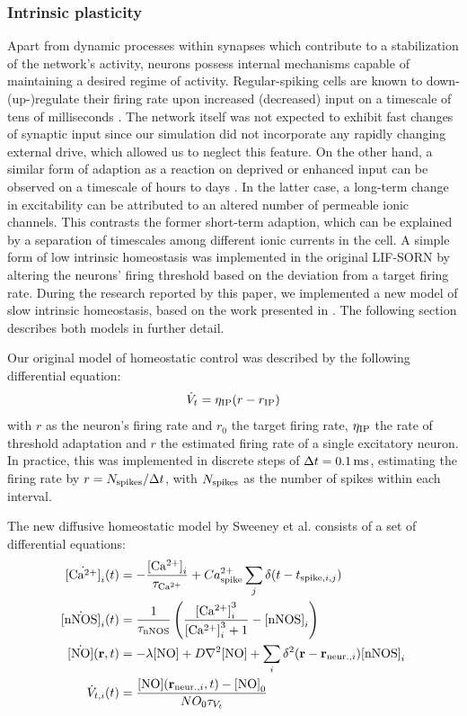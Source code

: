 \documentclass[10pt,letterpaper]{article}
\begin{document}
\subsubsection*{Intrinsic plasticity}
Apart from dynamic processes within synapses which contribute to a stabilization of the network's activity, neurons possess internal mechanisms capable of maintaining a desired regime of activity. Regular-spiking cells are known to down-(up-)regulate their firing rate upon increased (decreased) input on a timescale of tens of milliseconds \cite{Connors_Gutnick_Spike_Patterns,Benda_Herz_Spike_Frequ_Adaption}. The network itself was not expected to exhibit fast changes of synaptic input since our simulation did not incorporate any rapidly changing external drive, which allowed us to neglect this feature. On the other hand, a similar form of adaption as a reaction on deprived or enhanced input can be observed on a timescale of hours to days \cite{Desai_IP}. In the latter case, a long-term change in excitability can be attributed to an altered number of permeable ionic channels. This contrasts the former short-term adaption, which can be explained by a separation of timescales among different ionic currents in the cell. A simple form of low intrinsic homeostasis was implemented in the original LIF-SORN by altering the neurons' firing threshold based on the deviation from a target firing rate. During the research reported by this paper, we implemented a new model of slow intrinsic homeostasis, based on the work presented in \cite{Sweeney_Paper}. The following section describes both models in further detail.

Our original model of homeostatic control was described by the following differential equation:
\begin{equation}
\dot{V}_t = \eta_{\rm IP}(r-r_{\rm IP}) \label{can_hom_rate}
\end{equation}
with $r$ as the neuron's firing rate and $r_0$ the target firing rate, $\eta_{\rm IP}$ the rate of threshold adaptation and $r$ the estimated firing rate of a single excitatory neuron. In practice, this was implemented in discrete steps of $\Delta t = \rm 0.1\, ms$, estimating the firing rate by $r = N_{\rm spikes} / \Delta t$, with $N_{\rm spikes}$ as the number of spikes within each interval.

The new diffusive homeostatic model by Sweeney et al. consists of a set of differential equations:   
\begin{align}
\dot{{\rm [Ca^{2+}]}}_i(t) &= -\frac{{\rm [Ca^{2+}]}_i}{\tau_{\rm Ca^{2+}}} + Ca^{2+}_{\rm spike} \sum_{j} \delta(t-t_{\mathrm{spike},i,j}) \label{Ca_dyn}\\
\dot{{\rm [nNOS]}}_i(t) &= \frac{1}{\tau_{\rm nNOS}} \left(\frac{{\rm [Ca^{2+}]}_i^3}{{\rm [Ca^{2+}]}_i^3+1} - {\rm [nNOS]}_i \right) \label{nNOS_dyn}\\
\dot{{\rm [NO]}}(\mathbf{r},t)&=-\lambda {\rm [NO]} + D \nabla^2 {\rm [NO]} + \sum_{i} \delta^2(\mathbf{r}-\mathbf{r}_{\mathrm{neur.},i}) {\rm [nNOS]}_i \label{NO_dyn}\\
\dot{V}_{t,i}(t) &= \frac{{\rm [NO]}(\mathbf{r}_{\mathrm{neur.},i},t)-{\rm [NO]}_0}{NO_0 \tau_{V_t}} \label{Theta_dyn}
\end{align}
\end{document}

